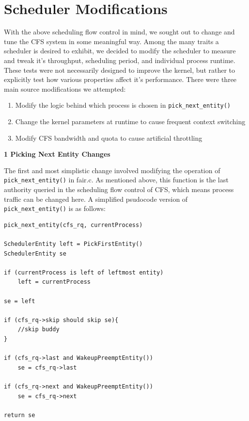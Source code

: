 \section{Scheduler Modifications}

With the above scheduling flow control in mind, we sought out to change and tune the CFS system in some meaningful way. Among the many traits a scheduler is desired to exhibit, we decided to modify the scheduler to measure and tweak it's throughput, scheduling period, and individual process runtime. These tests were not necessarily designed to improve the kernel, but rather to explicitly test how various properties affect it's performance. There were three main source modifications we attempted:
\begin{enumerate}
	\item Modify the logic behind which process is chosen in \texttt{pick\_next\_entity()}
	\item Change the kernel parameters at runtime to cause frequent context switching
	\item Modify CFS bandwidth and quota to cause artificial throttling
\end{enumerate}

\vspace{1pc}
\noindent\textbf{1 Picking Next Entity Changes}

\vspace{1pc}

The first and most simplistic change involved modifying the operation of \texttt{pick\_next\_entity()} in fair.c. As mentioned above, this function is the last authority queried in the scheduling flow control of CFS, which means process traffic can be changed here. A simplified psudocode version of \texttt{pick\_next\_entity()} is as follows:
\begin{lstlisting}
pick_next_entity(cfs_rq, currentProcess)

SchedulerEntity left = PickFirstEntity()
SchedulerEntity se

if (currentProcess is left of leftmost entity)
	left = currentProcess

se = left

if (cfs_rq->skip should skip se){
	//skip buddy
}

if (cfs_rq->last and WakeupPreemptEntity())
	se = cfs_rq->last
	
if (cfs_rq->next and WakeupPreemptEntity())
	se = cfs_rq->next

return se
\end{lstlisting}

